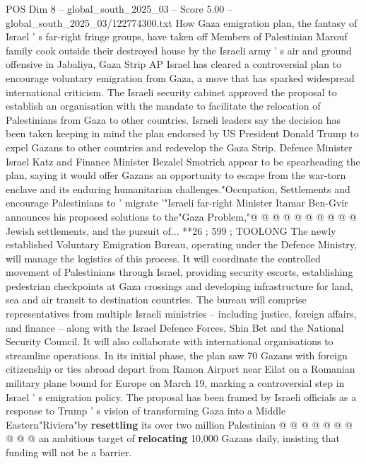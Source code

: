 \begin{textsample}{POS Dim 8 – global\_south\_2025\_03 – Score 5.00 – global\_south\_2025\_03/122774300.txt}  \label{ex:f8_pos_142}
How Gaza emigration plan, the fantasy of Israel ' s far-right fringe groups, have taken off Members of Palestinian Marouf family cook outside their destroyed house by the Israeli army ' s air and ground offensive in Jabaliya, Gaza Strip AP Israel has cleared a controversial plan to encourage voluntary emigration from Gaza, a move that has sparked widespread international criticism.
The Israeli security cabinet approved the proposal to establish an organisation with the mandate to facilitate the relocation of Palestinians from Gaza to other countries.
Israeli leaders say the decision has been taken keeping in mind the plan endorsed by US President Donald Trump to expel Gazans to other countries and redevelop the Gaza Strip.
Defence Minister Israel Katz and Finance Minister Bezalel Smotrich appear to be spearheading the plan, saying it would offer Gazans an opportunity to escape from the war-torn enclave and its enduring humanitarian challenges."Occupation, Settlements and encourage Palestinians to ' migrate '"Israeli far-right Minister Itamar Ben-Gvir announces his proposed solutions to the"Gaza Problem,"@ @ @ @ @ @ @ @ @ @ Jewish settlements, and the pursuit of... **26 ; 599 ; TOOLONG The newly established Voluntary Emigration Bureau, operating under the Defence Ministry, will manage the logistics of this process.
It will coordinate the controlled movement of Palestinians through Israel, providing security escorts, establishing pedestrian checkpoints at Gaza crossings and developing infrastructure for land, sea and air transit to destination countries.
The bureau will comprise representatives from multiple Israeli ministries -- including justice, foreign affairs, and finance -- along with the Israel Defence Forces, Shin Bet and the National Security Council.
It will also collaborate with international organisations to streamline operations.
In its initial phase, the plan saw 70 Gazans with foreign citizenship or ties abroad depart from Ramon Airport near Eilat on a Romanian military plane bound for Europe on March 19, marking a controversial step in Israel ' s emigration policy.
The proposal has been framed by Israeli officials as a response to Trump ' s vision of transforming Gaza into a Middle Eastern"Riviera"by \textbf{resettling} its over two million Palestinian @ @ @ @ @ @ @ @ @ @ an ambitious target of \textbf{relocating} 10,000 Gazans daily, insisting that funding will not be a barrier.

\end{textsample}
